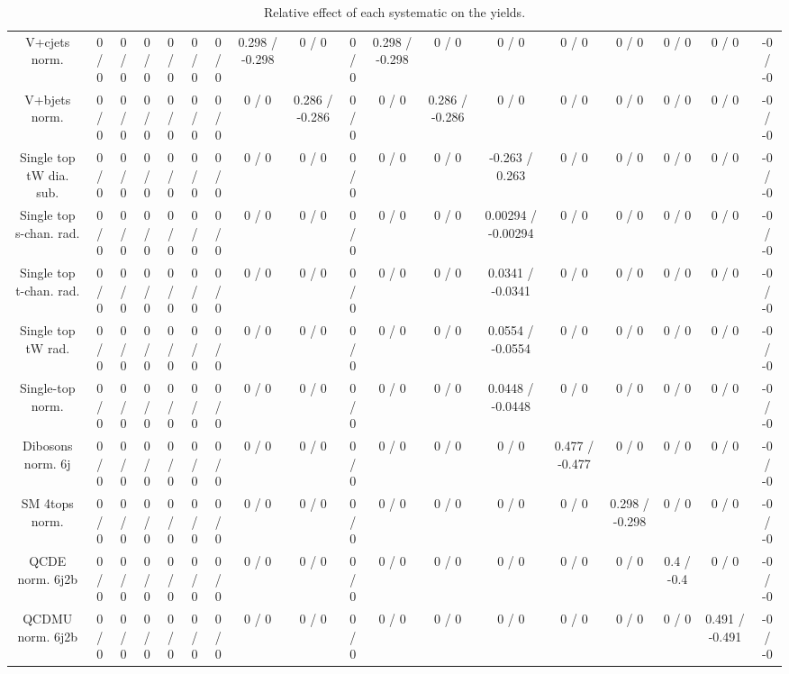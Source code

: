 \documentclass[10pt]{article}
\begin{document}
\begin{table}[htbp]
\begin{center}
\begin{tabular}{|c|c|c|c|c|c|c|c|c|c|c|c|c|c|c|c|c|c|}
  V+cjets norm. & 0 / 0 & 0 / 0 & 0 / 0 & 0 / 0 & 0 / 0 & 0 / 0 & 0.298 / -0.298 & 0 / 0 & 0 / 0 & 0.298 / -0.298 & 0 / 0 & 0 / 0 & 0 / 0 & 0 / 0 & 0 / 0 & 0 / 0 & -0 / -0 \\ 
  V+bjets norm. & 0 / 0 & 0 / 0 & 0 / 0 & 0 / 0 & 0 / 0 & 0 / 0 & 0 / 0 & 0.286 / -0.286 & 0 / 0 & 0 / 0 & 0.286 / -0.286 & 0 / 0 & 0 / 0 & 0 / 0 & 0 / 0 & 0 / 0 & -0 / -0 \\ 
  Single top tW dia. sub. & 0 / 0 & 0 / 0 & 0 / 0 & 0 / 0 & 0 / 0 & 0 / 0 & 0 / 0 & 0 / 0 & 0 / 0 & 0 / 0 & 0 / 0 & -0.263 / 0.263 & 0 / 0 & 0 / 0 & 0 / 0 & 0 / 0 & -0 / -0 \\ 
  Single top s-chan. rad. & 0 / 0 & 0 / 0 & 0 / 0 & 0 / 0 & 0 / 0 & 0 / 0 & 0 / 0 & 0 / 0 & 0 / 0 & 0 / 0 & 0 / 0 & 0.00294 / -0.00294 & 0 / 0 & 0 / 0 & 0 / 0 & 0 / 0 & -0 / -0 \\ 
  Single top t-chan. rad. & 0 / 0 & 0 / 0 & 0 / 0 & 0 / 0 & 0 / 0 & 0 / 0 & 0 / 0 & 0 / 0 & 0 / 0 & 0 / 0 & 0 / 0 & 0.0341 / -0.0341 & 0 / 0 & 0 / 0 & 0 / 0 & 0 / 0 & -0 / -0 \\ 
  Single top tW rad. & 0 / 0 & 0 / 0 & 0 / 0 & 0 / 0 & 0 / 0 & 0 / 0 & 0 / 0 & 0 / 0 & 0 / 0 & 0 / 0 & 0 / 0 & 0.0554 / -0.0554 & 0 / 0 & 0 / 0 & 0 / 0 & 0 / 0 & -0 / -0 \\ 
  Single-top norm. & 0 / 0 & 0 / 0 & 0 / 0 & 0 / 0 & 0 / 0 & 0 / 0 & 0 / 0 & 0 / 0 & 0 / 0 & 0 / 0 & 0 / 0 & 0.0448 / -0.0448 & 0 / 0 & 0 / 0 & 0 / 0 & 0 / 0 & -0 / -0 \\ 
  Dibosons norm. 6j & 0 / 0 & 0 / 0 & 0 / 0 & 0 / 0 & 0 / 0 & 0 / 0 & 0 / 0 & 0 / 0 & 0 / 0 & 0 / 0 & 0 / 0 & 0 / 0 & 0.477 / -0.477 & 0 / 0 & 0 / 0 & 0 / 0 & -0 / -0 \\ 
  SM 4tops norm. & 0 / 0 & 0 / 0 & 0 / 0 & 0 / 0 & 0 / 0 & 0 / 0 & 0 / 0 & 0 / 0 & 0 / 0 & 0 / 0 & 0 / 0 & 0 / 0 & 0 / 0 & 0.298 / -0.298 & 0 / 0 & 0 / 0 & -0 / -0 \\ 
  QCDE norm. 6j2b & 0 / 0 & 0 / 0 & 0 / 0 & 0 / 0 & 0 / 0 & 0 / 0 & 0 / 0 & 0 / 0 & 0 / 0 & 0 / 0 & 0 / 0 & 0 / 0 & 0 / 0 & 0 / 0 & 0.4 / -0.4 & 0 / 0 & -0 / -0 \\ 
  QCDMU norm. 6j2b & 0 / 0 & 0 / 0 & 0 / 0 & 0 / 0 & 0 / 0 & 0 / 0 & 0 / 0 & 0 / 0 & 0 / 0 & 0 / 0 & 0 / 0 & 0 / 0 & 0 / 0 & 0 / 0 & 0 / 0 & 0.491 / -0.491 & -0 / -0 \\ 
\hline 
\end{tabular} 
\caption{Relative effect of each systematic on the yields.} 
\end{center} 
\end{table} 
\end{document}
